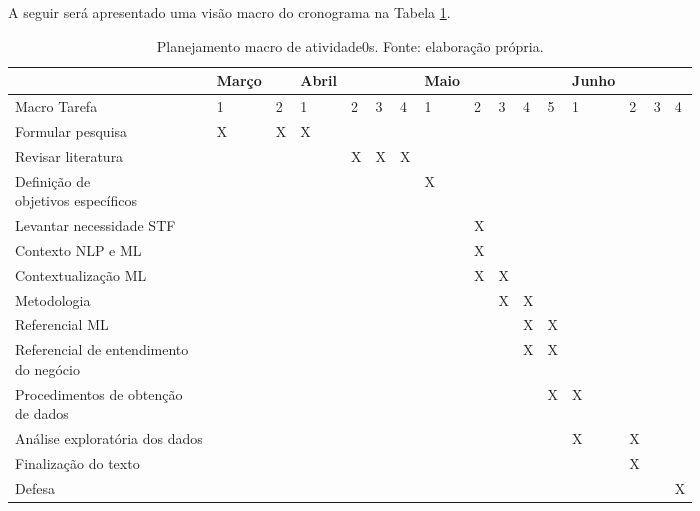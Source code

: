 A seguir será apresentado uma visão macro do cronograma na Tabela \ref{tab:cronograma}.
\begin{table}[h]
	\centering    
	\caption{Planejamento macro de atividade0s. Fonte: elaboração própria.}
    \label{tab:cronograma}
	\begin{tabular}{|l|p{}p{0.4cm}|p{0.4cm}p{0.4cm}p{0.4cm}p{0.4cm}|p{0.4cm}p{0.4cm}p{0.4cm}p{0.4cm}p{0.4cm}|p{0.4cm}p{0.4cm}p{0.4cm}p{0.4cm}|}
    	\hline
		& Março & & Abril & & & & Maio & & & & & Junho & & &  \\ \hline
Macro Tarefa                                   & 1 & 2 & 1 & 2 & 3 & 4 & 1 & 2 & 3 & 4 & 5 & 1 & 2 & 3 & 4 \\ \hline
Formular pesquisa                              & X & X & X &   &   &   &   &   &   &   &   &   &   &   &   \\ \hline
Revisar literatura                             &   &   &   & X & X & X &   &   &   &   &   &   &   &   &   \\ \hline
\makecell[l]{Definição de \\ objetivos específicos}             &   &   &   &   &   &   & X &   &   &   &   &   &   &   &   \\ \hline
Levantar necessidade STF                       &   &   &   &   &   &   &   & X &   &   &   &   &   &   &   \\ \hline
Contexto NLP e ML                              &   &   &   &   &   &   &   & X &   &   &   &   &   &   &   \\ \hline
Contextualização ML              &   &   &   &   &   &   &   & X & X &   &   &   &   &   &   \\ \hline
Metodologia                                    &   &   &   &   &   &   &   &   & X & X &   &   &   &   &   \\ \hline
Referencial ML              &   &   &   &   &   &   &   &   &   & X & X &   &   &   &   \\ \hline
\makecell[l]{Referencial de entendimento \\ do negócio} &   &   &   &   &   &   &   &   &   & X & X &   &   &   &   \\ \hline
\makecell[l]{Procedimentos de obtenção\\ de dados}             &   &   &   &   &   &   &   &   &   &   & X & X &   &   &   \\ \hline
Análise exploratória dos dados                 &   &   &   &   &   &   &   &   &   &   &   & X & X &   &   \\ \hline
Finalização do texto      &   &   &   &   &   &   &   &   &   &   &   &   & X &   &   \\ \hline
Defesa                                         &   &   &   &   &   &   &   &   &   &   &   &   &   &   & X \\ \hline
	\end{tabular}
\end{table}